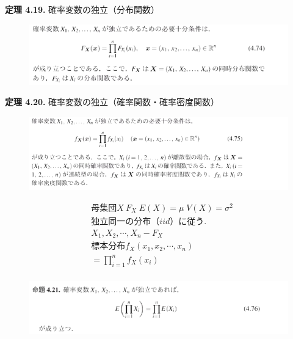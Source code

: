 \documentclass[dvipdfmx,10pt, a4j]{jarticle}
\theoremstyle{definition}
\begin{document}
\noindent
\textbf{定理 4.19.} 確率変数の独立（分布関数）\\
\begin{figure}[htbp]
\includegraphics[width=\linewidth]{D_11/teiri/4_19.png}
\end{figure}

\noindent
\textbf{定理 4.20.} 確率変数の独立（確率関数・確率密度関数）\\
\begin{figure}[htbp]
\includegraphics[width=\linewidth]{D_11/teiri/4_20.png}
\end{figure}
\begin{align*}
  &母集団 X ~ F_X \; E(X) = \mu \; V(X) = \sigma^2\\
  &独立同一の分布（iid）に従う.\\
  &X_1, X_2, \cdots , X_n - F_X\\
  &標本分布 f_X(x_1, x_2, \cdots , x_n)\\
  &= \prod_{i=1}^{n}f_X(x_i)\\
\end{align*}

\noindent
\begin{figure}[htbp]
\includegraphics[width=\linewidth]{D_11/meidai/4_21.png}
\end{figure}
\end{document}
